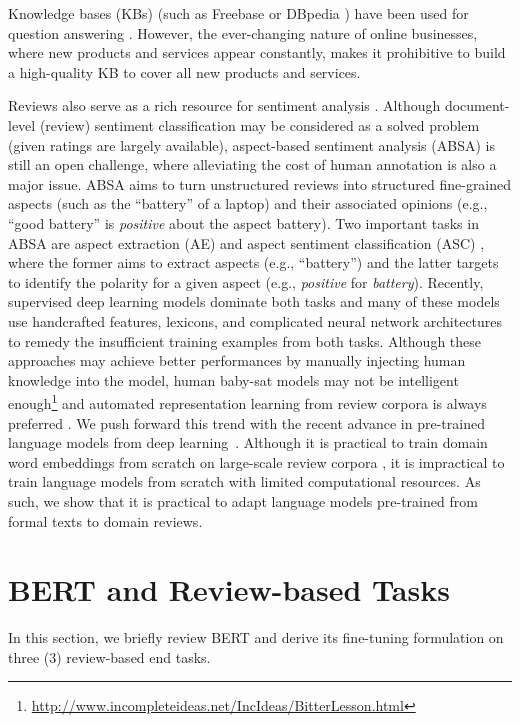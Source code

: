\documentclass[11pt,a4paper]{article}
\begin{document}
Knowledge bases (KBs) (such as Freebase \cite{dong2015question,xu2016question,yao2014information} or DBpedia \cite{lopez2010scaling,unger2012template}) have been used for question answering \cite{yu2018aware}.
However, the ever-changing nature of online businesses, where new products and services appear constantly, makes it prohibitive to build a high-quality KB to cover all new products and services.

Reviews also serve as a rich resource for sentiment analysis \cite{pang2002thumbs,hu2004mining,liu2012sentiment,liu2015sentiment}.
Although document-level (review) sentiment classification may be considered as a solved problem (given ratings are largely available), aspect-based sentiment analysis (ABSA) is still an open challenge, where alleviating the cost of human annotation is also a major issue.
ABSA aims to turn unstructured reviews into structured fine-grained aspects (such as the ``battery'' of a laptop) and their associated opinions (e.g., ``good battery'' is \emph{positive} about the aspect battery).
Two important tasks in ABSA are aspect extraction (AE) and aspect sentiment classification (ASC) \cite{hu2004mining}, where the former aims to extract aspects (e.g., ``battery'') and the latter targets to identify the polarity for a given aspect (e.g., \emph{positive} for \emph{battery}).
Recently, supervised deep learning models dominate both tasks \cite{wang2016recursive,wang2017coupled,xu_acl2018,tang2016aspect,he2018exploiting} and many of these models use handcrafted features, lexicons, and complicated neural network architectures to remedy the insufficient training examples from both tasks.
Although these approaches may achieve better performances by manually injecting human knowledge into the model, human baby-sat models may not be intelligent enough\footnote{\url{http://www.incompleteideas.net/IncIdeas/BitterLesson.html}} and automated representation learning from review corpora is always preferred \cite{xu_acl2018,he2018exploiting}.
We push forward this trend with the recent advance in pre-trained language models from deep learning~\cite{peters2018deep,howard2018universal,devlin2018bert,radford2018improving,radford2018lang}. 
Although it is practical to train domain word embeddings from scratch on large-scale review corpora \cite{xu_acl2018}, it is impractical to train language models from scratch with limited computational resources.
As such, we show that it is practical to adapt language models pre-trained from formal texts to domain reviews.

\section{BERT and Review-based Tasks}
In this section, we briefly review BERT and derive its fine-tuning formulation on three (3) review-based end tasks.
\end{document}
